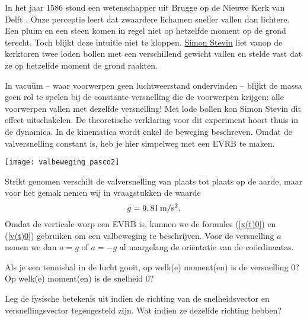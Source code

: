 \documentclass{ximera}
\begin{document}
	\author{Bart Lambregs}
    \xmsource\xmuitleg



 In het jaar 1586 stond een wetenschapper uit Brugge op de Nieuwe Kerk van Delft . 
 Onze perceptie leert dat zwaardere lichamen sneller vallen dan lichtere. 
 Een pluim en een steen komen in regel niet op hetzelfde moment op de grond terecht. 
 Toch blijkt deze intuitie niet te kloppen. \href{https://www.canonvanvlaanderen.be/events/simon-stevin/}{Simon Stevin} liet vanop de kerktoren twee loden bollen met een verschillend gewicht vallen en stelde vast dat ze op hetzelfde moment de grond raakten. 
	

In vacuüm -- waar voorwerpen geen luchtweerstand ondervinden -- blijkt de massa geen rol te spelen bij de constante versnelling die de voorwerpen krijgen: alle voorwerpen vallen met dezelfde versnelling! 
Met lode bollen kon Simon Stevin dit effect uitschakelen. 
De theoretische verklaring voor dit experiment hoort thuis in de dynamica. 
In de kinematica wordt enkel de beweging beschreven. 
Omdat de valversnelling constant is, heb je hier simpelweg met een EVRB te maken.

\begin{image}

\texttt{[image: valbeweging\_pasco2]}
\end{image}
Strikt genomen verschilt de valversnelling van plaats tot plaats op de aarde, maar voor het gemak nemen wij in vraagstukken de waarde
\[g=9,81\rm\,m/s^2.\]
Omdat de verticale worp een EVRB is, kunnen we de formules (\ref{x(t)0}) en (\ref{v(t)0}) gebruiken om een valbeweging te beschrijven. Voor de versnelling $a$ nemen we dan $a=g$ of $a=-g$ al naargelang de oriëntatie van de coördinaatas.

\begin{quickquestion*}{}{}
Als je een tennisbal in de lucht gooit, op welk(e) moment(en) is de versnelling \(0\)? Op welk(e) moment(en) is de snelheid \(0\)? 
\end{quickquestion*}

\begin{quickquestion*}{}{}
Leg de fysische betekenis uit indien de richting van de snelheidsvector en versnellingsvector tegengesteld zijn. Wat indien ze dezelfde richting hebben?
\end{quickquestion*}
\end{document}
